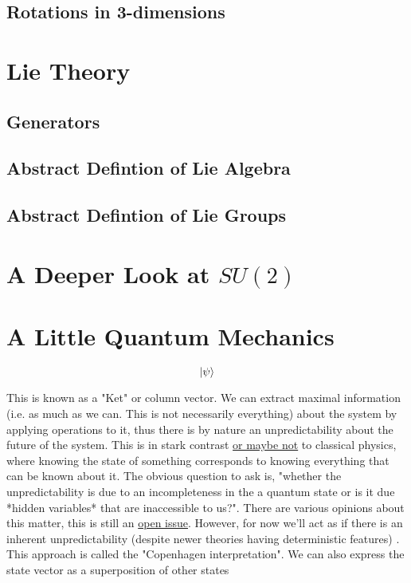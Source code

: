 \documentclass[]{article}
\begin{document}
\subsection{Rotations in 3-dimensions}

\section{Lie Theory}
\subsection{Generators}
\subsection{Abstract Defintion of Lie Algebra}
\subsection{Abstract Defintion of Lie Groups}

\section{A Deeper Look at $SU(2)$}
\section{A Little Quantum Mechanics}
$$\ket{\psi}$$

This is known as a "Ket" or column vector. We can extract maximal information (i.e. as much as we can. This is not necessarily everything) about the system by applying operations to it, thus there is by nature an unpredictability about the future of the system. This is in stark contrast \href{https://arxiv.org/abs/1909.04514}{or maybe not} to classical physics, where knowing the state of something corresponds to knowing everything that can be known about it. The obvious question to ask is, "whether the unpredictability is due to an incompleteness in the a quantum state or is it due *hidden variables* that are inaccessible to us?". There are various opinions about this matter, this is still an \href{https://plato.stanford.edu/entries/qt-issues/#QuesQuanStatReal}{open issue}. However, for now we'll act as if there is an inherent unpredictability (despite newer theories having deterministic features) . This approach is called the "Copenhagen interpretation". We can also express the state vector as a superposition of other states\\
\end{document}
